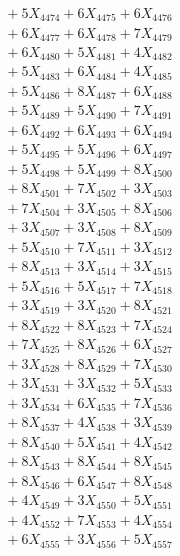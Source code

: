 \documentclass[a4paper,10pt]{article}
\begin{document}
{\begin{align}
&\;  + 5 X_{4474} + 6 X_{4475} + 6 X_{4476} \\[0.3ex]
&\;  + 6 X_{4477} + 6 X_{4478} + 7 X_{4479} \\[0.5ex]\allowbreak
&\;  + 6 X_{4480} + 5 X_{4481} + 4 X_{4482} \\[0.3ex]
&\;  + 5 X_{4483} + 6 X_{4484} + 4 X_{4485} \\[0.3ex]
&\;  + 5 X_{4486} + 8 X_{4487} + 6 X_{4488} \\[0.3ex]
&\;  + 5 X_{4489} + 5 X_{4490} + 7 X_{4491} \\[0.3ex]
&\;  + 6 X_{4492} + 6 X_{4493} + 6 X_{4494} \\[0.3ex]
&\;  + 5 X_{4495} + 5 X_{4496} + 6 X_{4497} \\[0.3ex]
&\;  + 5 X_{4498} + 5 X_{4499} + 8 X_{4500} \\[0.3ex]
&\;  + 8 X_{4501} + 7 X_{4502} + 3 X_{4503} \\[0.3ex]
&\;  + 7 X_{4504} + 3 X_{4505} + 8 X_{4506} \\[0.3ex]
&\;  + 3 X_{4507} + 3 X_{4508} + 8 X_{4509} \\[0.5ex]\allowbreak
&\;  + 5 X_{4510} + 7 X_{4511} + 3 X_{4512} \\[0.3ex]
&\;  + 8 X_{4513} + 3 X_{4514} + 3 X_{4515} \\[0.3ex]
&\;  + 5 X_{4516} + 5 X_{4517} + 7 X_{4518} \\[0.3ex]
&\;  + 3 X_{4519} + 3 X_{4520} + 8 X_{4521} \\[0.3ex]
&\;  + 8 X_{4522} + 8 X_{4523} + 7 X_{4524} \\[0.3ex]
&\;  + 7 X_{4525} + 8 X_{4526} + 6 X_{4527} \\[0.3ex]
&\;  + 3 X_{4528} + 8 X_{4529} + 7 X_{4530} \\[0.3ex]
&\;  + 3 X_{4531} + 3 X_{4532} + 5 X_{4533} \\[0.3ex]
&\;  + 3 X_{4534} + 6 X_{4535} + 7 X_{4536} \\[0.3ex]
&\;  + 8 X_{4537} + 4 X_{4538} + 3 X_{4539} \\[0.5ex]\allowbreak
&\;  + 8 X_{4540} + 5 X_{4541} + 4 X_{4542} \\[0.3ex]
&\;  + 8 X_{4543} + 8 X_{4544} + 8 X_{4545} \\[0.3ex]
&\;  + 8 X_{4546} + 6 X_{4547} + 8 X_{4548} \\[0.3ex]
&\;  + 4 X_{4549} + 3 X_{4550} + 5 X_{4551} \\[0.3ex]
&\;  + 4 X_{4552} + 7 X_{4553} + 4 X_{4554} \\[0.3ex]
&\;  + 6 X_{4555} + 3 X_{4556} + 5 X_{4557} \\[0.3ex]

\end{align}}
\end{document}
